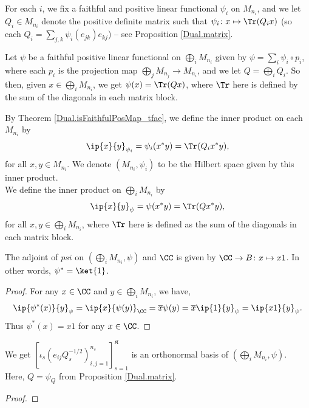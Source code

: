 \begin{definition}\label{PiMat.InnerProductSpace}
  \leanok
  For each $i$, we fix a faithful and positive linear functional $\psi_i$ on $M_{n_i}$, and we let $Q_i\in{M_{n_i}}$ denote the positive definite matrix such that $\psi_i\colon x\mapsto\Tr(Q_ix)$ (so each $Q_i=\sum_{j,k}\psi_i(e_{jk})e_{kj}$) -- see Proposition \ref{Dual.matrix}.

  Let $\psi$ be a faithful positive linear functional on $\bigoplus_iM_{n_i}$ given by $\psi=\sum_i\psi_i\circ p_i$, where each $p_i$ is the projection map $\bigoplus_jM_{n_j}\to M_{n_i}$, and we let $Q=\bigoplus_iQ_i$. So then, given $x\in\bigoplus_i{M_{n_i}}$, we get $\psi(x)=\Tr(Q x)$, where $\Tr$ here is defined by the sum of the diagonals in each matrix block.

  By Theorem \ref{Dual.isFaithfulPosMap_tfae}, we define the inner product on each $M_{n_i}$ by
  \[\ip{x}{y}_{\psi_i}=\psi_i(x^*y)=\Tr(Q_ix^*y),\]
  for all $x,y\in{M_{n_i}}$. We denote $(M_{n_i},\psi_i)$ to be the Hilbert space given by this inner product.\\
  We define the inner product on $\bigoplus_iM_{n_i}$ by \[\ip{x}{y}_{\psi}=\psi(x^*y)=\Tr(Q x^*y),\] for all $x,y\in\bigoplus_i{M_{n_i}}$, where $\Tr$ here is defined as the sum of the diagonals in each matrix block.
 \end{definition}

 \begin{proposition}\label{Dual.IsFaithfulPosMap.adjoint_eq_unit}
  \leanok
  The adjoint of $psi$ on $(\bigoplus_iM_{n_i},\psi)$ and $\CC$ is given by $\CC\to{B}\colon{x\mapsto{x1}}$. In other words, $\psi^*=\ket{1}$.
 \end{proposition}
 \begin{proof}\leanok
  For any $x\in\CC$ and $y\in\bigoplus_i{M_{n_i}}$, we have,
  \[\ip{\psi^*(x)}{y}_{\psi}=\ip{x}{\psi(y)}_\CC=\overline{x}\psi(y)=\overline{x}\ip{1}{y}_{\psi}=\ip{x1}{y}_{\psi}.\]
  Thus $\psi^*(x)=x1$ for any $x\in\CC$.
 \end{proof}

 \begin{proposition}\label{PiMat.onb}
  \leanok
  We get $\left[\iota_s(e_{ij}Q_s^{-1/2})_{i,j=1}^{n_s}\right]_{s=1}^{\mathfrak{K}}$ is an orthonormal basis of $(\bigoplus_iM_{n_i},\psi)$.\\
  Here, $Q=\psi_Q$ from Proposition \ref{Dual.matrix}.
 \end{proposition}
 \begin{proof}
 \end{proof}

